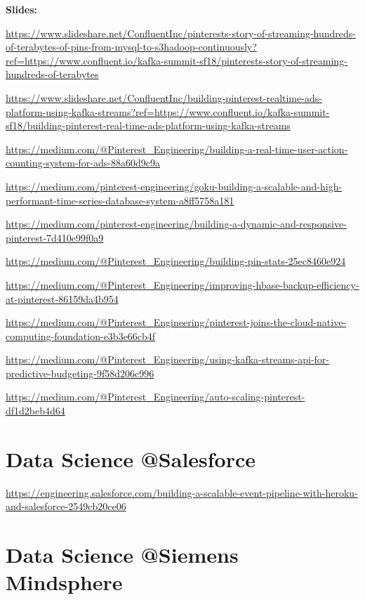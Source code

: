 \documentclass[12pt, numbers=noenddot]{scrreprt} %
\begin{document}
\textbf{Slides:}

\url{https://www.slideshare.net/ConfluentInc/pinterests-story-of-streaming-hundreds-of-terabytes-of-pins-from-mysql-to-s3hadoop-continuously?ref=https://www.confluent.io/kafka-summit-sf18/pinterests-story-of-streaming-hundreds-of-terabytes} 

\url{https://www.slideshare.net/ConfluentInc/building-pinterest-realtime-ads-platform-using-kafka-streams?ref=https://www.confluent.io/kafka-summit-sf18/building-pinterest-real-time-ads-platform-using-kafka-streams}

\url{https://medium.com/@Pinterest_Engineering/building-a-real-time-user-action-counting-system-for-ads-88a60d9c9a}

\url{https://medium.com/pinterest-engineering/goku-building-a-scalable-and-high-performant-time-series-database-system-a8ff5758a181}

\url{https://medium.com/pinterest-engineering/building-a-dynamic-and-responsive-pinterest-7d410e99f0a9}

\url{https://medium.com/@Pinterest_Engineering/building-pin-stats-25ec8460e924}

\url{https://medium.com/@Pinterest_Engineering/improving-hbase-backup-efficiency-at-pinterest-86159da4b954}

\url{https://medium.com/@Pinterest_Engineering/pinterest-joins-the-cloud-native-computing-foundation-e3b3e66cb4f}

\url{https://medium.com/@Pinterest_Engineering/using-kafka-streams-api-for-predictive-budgeting-9f58d206c996}

\url{https://medium.com/@Pinterest_Engineering/auto-scaling-pinterest-df1d2beb4d64}

\section{Data Science @Salesforce}
\url{https://engineering.salesforce.com/building-a-scalable-event-pipeline-with-heroku-and-salesforce-2549cb20ce06}

\section{Data Science @Siemens Mindsphere}
\end{document}
